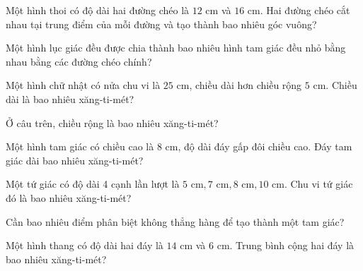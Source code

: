 \begin{ex}
  Một hình thoi có độ dài hai đường chéo là $12\text{ cm}$ và $16\text{ cm}$. Hai đường chéo cắt nhau tại trung điểm của mỗi đường và tạo thành bao nhiêu góc vuông?
\end{ex}

\begin{ex}
  Một hình lục giác đều được chia thành bao nhiêu hình tam giác đều nhỏ bằng nhau bằng các đường chéo chính?
\end{ex}

\begin{ex}
  Một hình chữ nhật có nửa chu vi là $25\text{ cm}$, chiều dài hơn chiều rộng $5\text{ cm}$. Chiều dài là bao nhiêu xăng-ti-mét?
\end{ex}

\begin{ex}
  Ở câu trên, chiều rộng là bao nhiêu xăng-ti-mét?
\end{ex}

\begin{ex}
  Một hình tam giác có chiều cao là $8\text{ cm}$, độ dài đáy gấp đôi chiều cao. Đáy tam giác dài bao nhiêu xăng-ti-mét?
\end{ex}

\begin{ex}
  Một tứ giác có độ dài 4 cạnh lần lượt là $5\text{ cm}, 7\text{ cm}, 8\text{ cm}, 10\text{ cm}$. Chu vi tứ giác đó là bao nhiêu xăng-ti-mét?
\end{ex}

\begin{ex}
  Cần bao nhiêu điểm phân biệt không thẳng hàng để tạo thành một tam giác?
\end{ex}

\begin{ex}
  Một hình thang có độ dài hai đáy là $14\text{ cm}$ và $6\text{ cm}$. Trung bình cộng hai đáy là bao nhiêu xăng-ti-mét?
\end{ex}

